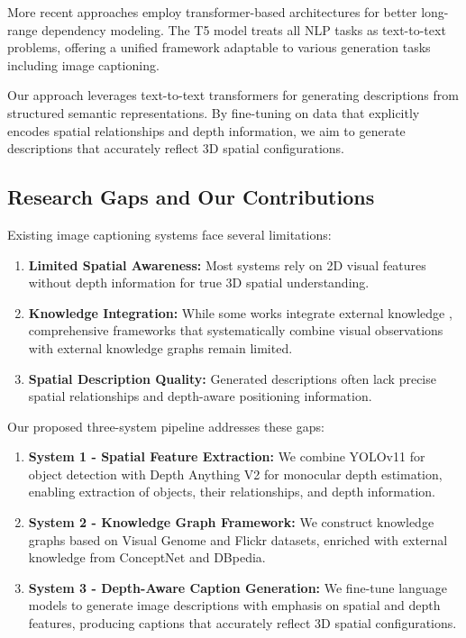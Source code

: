 \documentclass[runningheads,14pt]{llncs}
\begin{document}
More recent approaches employ transformer-based architectures \cite{li2019entangled, cornia2020meshed} for better long-range dependency modeling. The T5 model \cite{raffel2020exploring} treats all NLP tasks as text-to-text problems, offering a unified framework adaptable to various generation tasks including image captioning.

Our approach leverages text-to-text transformers for generating descriptions from structured semantic representations. By fine-tuning on data that explicitly encodes spatial relationships and depth information, we aim to generate descriptions that accurately reflect 3D spatial configurations.

\subsection{Research Gaps and Our Contributions}

Existing image captioning systems face several limitations:

\begin{enumerate}
\item \textbf{Limited Spatial Awareness:} Most systems \cite{vinyals2015show, xu2015show} rely on 2D visual features without depth information for true 3D spatial understanding.

\item \textbf{Knowledge Integration:} While some works integrate external knowledge \cite{marino2017ok, zhao2021knowledge}, comprehensive frameworks that systematically combine visual observations with external knowledge graphs remain limited.

\item \textbf{Spatial Description Quality:} Generated descriptions often lack precise spatial relationships and depth-aware positioning information.
\end{enumerate}

Our proposed three-system pipeline addresses these gaps:

\begin{enumerate}
\item \textbf{System 1 - Spatial Feature Extraction:} We combine YOLOv11 for object detection with Depth Anything V2 for monocular depth estimation, enabling extraction of objects, their relationships, and depth information.

\item \textbf{System 2 - Knowledge Graph Framework:} We construct knowledge graphs based on Visual Genome \cite{krishna2017visual} and Flickr \cite{young2014image} datasets, enriched with external knowledge from ConceptNet and DBpedia.

\item \textbf{System 3 - Depth-Aware Caption Generation:} We fine-tune language models to generate image descriptions with emphasis on spatial and depth features, producing captions that accurately reflect 3D spatial configurations.
\end{enumerate}
\end{document}
